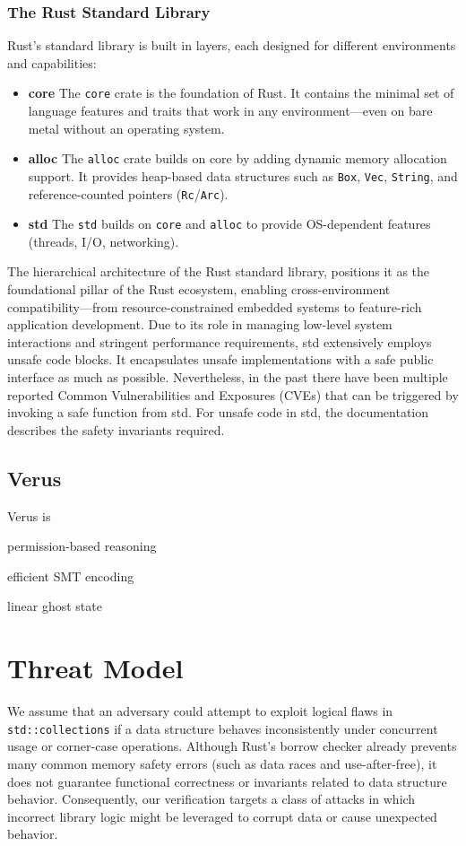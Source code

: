 \documentclass[conference]{IEEEtran}
\begin{document}
\subsubsection{The Rust Standard Library}
Rust’s standard library is built in layers, each designed for different environments and capabilities:
\begin{itemize}
        \item \textbf{core} The \texttt{core} crate is the foundation of Rust. It contains the minimal set of language features and traits that work in any environment—even on bare metal without an operating system.
        \item \textbf{alloc} The \texttt{alloc} crate builds on core by adding dynamic memory allocation support. It provides heap-based data structures such as \texttt{Box}, \texttt{Vec}, \texttt{String}, and reference-counted pointers (\texttt{Rc}/\texttt{Arc}).
        \item \textbf{std} The \texttt{std} builds on \texttt{core} and \texttt{alloc} to provide OS-dependent features (threads, I/O, networking).
\end{itemize}

The hierarchical architecture of the Rust standard library, positions it as the foundational pillar of the Rust ecosystem, enabling cross-environment compatibility—from resource-constrained embedded systems to feature-rich application development. Due to its role in managing low-level system interactions and stringent performance requirements, std extensively employs unsafe code blocks. It encapsulates unsafe implementations with a safe public interface as much as possible. Nevertheless, in the past there have been multiple reported Common Vulnerabilities and Exposures (CVEs)\cite{Qwaz_rust-cve} that can be triggered by invoking a safe function from std. For unsafe code in std, the documentation describes the safety invariants required.   


\subsection{Verus}
Verus\cite{verus} is 


permission-based reasoning

efficient SMT encoding

linear ghost state

\section{Threat Model}
We assume that an adversary could attempt to exploit logical flaws in \texttt{std::collections} if a data structure behaves inconsistently under concurrent usage or corner-case operations. Although Rust's borrow checker already prevents many common memory safety errors (such as data races and use-after-free), it does not guarantee functional correctness or invariants related to data structure behavior. Consequently, our verification targets a class of attacks in which incorrect library logic might be leveraged to corrupt data or cause unexpected behavior.
\end{document}
